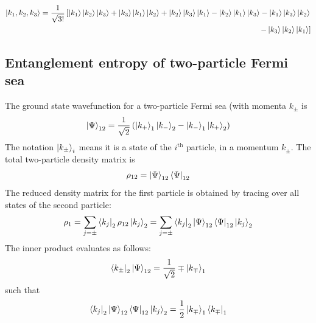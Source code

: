 \documentclass[12pt,twoside]{article}
\numberwithin{equation}{section}
\begin{document}
{\begin{equation}\begin{aligned}
	\ket{k_1, k_2, k_3} = \frac{1}{\sqrt{3!}}\left[\ket{k_1}\ket{k_2}\ket{k_3} + \ket{k_3}\ket{k_1}\ket{k_2} + \ket{k_2}\ket{k_3}\ket{k_1} - \ket{k_2}\ket{k_1}\ket{k_3} - \ket{k_1}\ket{k_3}\ket{k_2} \right.\\
\left.- \ket{k_3}\ket{k_2}\ket{k_1}\right] 
\end{aligned}\end{equation}
\subsection{Entanglement entropy of two-particle Fermi sea}
The ground state wavefunction for a two-particle Fermi sea (with momenta \(k_\pm\) is
\begin{equation}\begin{aligned}
	\ket{\Psi}_{12} = \frac{1}{\sqrt 2}\left( \ket{k_+}_1\ket{k_-}_2 - \ket{k_-}_1\ket{k_+}_2 \right) 
\end{aligned}\end{equation}
The notation \(\ket{k_\pm}_i\) means it is a state of the \(i^\text{th}\) particle, in a momentum \(k_\pm\). The total two-particle density matrix is
\begin{equation}\begin{aligned}
	\rho_{12} = \ket{\Psi}_{12}\bra{\Psi}_{12}
\end{aligned}\end{equation}
The reduced density matrix for the first particle is obtained by tracing over all states of the second particle:
\begin{equation}\begin{aligned}
	\rho_1 = \sum_{j=\pm}\bra{k_j}_2 \rho_{12}\ket{k_j}_2 = \sum_{j=\pm}\bra{k_j}_2 \ket{\Psi}_{12}\bra{\Psi}_{12}\ket{k_j}_2
\end{aligned}\end{equation}
The inner product evaluates as follows:
\begin{equation}\begin{aligned}
	\bra{k_\pm}_2 \ket{\Psi}_{12}= \frac{1}{\sqrt 2} \mp \ket{k_\mp}_1
\end{aligned}\end{equation}
such that
\begin{equation}\begin{aligned}
\bra{k_j}_2 \ket{\Psi}_{12}\bra{\Psi}_{12}\ket{k_j}_2 = \frac{1}{2}\ket{k_\mp}_1\bra{k_\mp}_1
\end{aligned}\end{equation}
}
\end{document}
